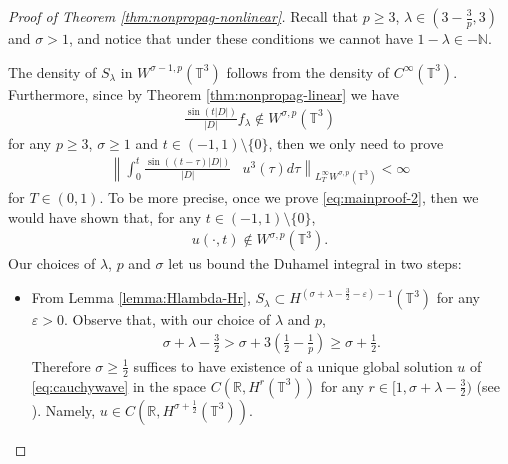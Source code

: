 \documentclass[a4paper, reqno, 11pt]{amsart}
\theoremstyle{definition}
\begin{document}
	
	\begin{proof}[Proof of Theorem \ref{thm:nonpropag-nonlinear}]
	Recall that $p \geq 3$, $\lambda \in (3-\frac{3}{p},3)$ and $\sigma > 1$, and notice that under these conditions we cannot have $1 - \lambda \in -\mathbb{N}$.
	
	The density of $S_{\lambda}$ in $W^{\sigma - 1,p}(\mathbb{T}^3)$ follows from the density of $C^{\infty}(\mathbb{T}^3)$. Furthermore, since by Theorem \ref{thm:nonpropag-linear} we have
	\begin{align*}
	\frac{\sin(t|D|)}{|D|} f_{\lambda} \notin W^{\sigma,p}(\mathbb{T}^3)
	\end{align*}
	for any $p \geq 3$, $\sigma \geq 1$ and $t \in (-1,1) \setminus \{0\}$, then we only need to prove
	\begin{align}\label{eq:mainproof-2}
	\left\| \int_0^t \frac{\sin((t-\tau)|D|)}{|D|} \right. & \left. u^3(\tau) d\tau \right\|_{L^{\infty}_T W^{\sigma,p}(\mathbb{T}^3)} < \infty
	\end{align}
	for $T \in (0,1)$. To be more precise, once we prove \eqref{eq:mainproof-2}, then we would have shown that, for any $t \in (-1,1) \setminus \{0\}$,
	\begin{align*}
	u(\cdot,t) \notin W^{\sigma,p}(\mathbb{T}^3).
	\end{align*}
	Our choices of $\lambda$, $p$ and $\sigma$ let us bound the Duhamel integral in two steps:
	
	\begin{itemize}
	\item From Lemma \ref{lemma:Hlambda-Hr}, $S_{\lambda} \subset H^{(\sigma  + \lambda - \frac{3}{2}-\varepsilon)-1}(\mathbb{T}^3)$ for any $\varepsilon > 0$. Observe that, with our choice of $\lambda$ and $p$,
	\begin{align*}
	\sigma + \lambda - \frac{3}{2} > \sigma + 3 \left( \frac{1}{2} - \frac{1}{p}\right) \geq \sigma + \frac{1}{2}.
	\end{align*} 
	Therefore $\sigma \geq \frac{1}{2}$ suffices to have existence of a unique global solution $u$ of \eqref{eq:cauchywave} in the space $C(\mathbb{R},H^r(\mathbb{T}^3))$ for any $r \in [1,\sigma + \lambda - \frac{3}{2})$ (see \cite{Tzvetkov2019-notes}). Namely, $u \in C(\mathbb{R},H^{\sigma + \frac{1}{2}}(\mathbb{T}^3))$.
	

\end{itemize}
\end{proof}
\end{document}
